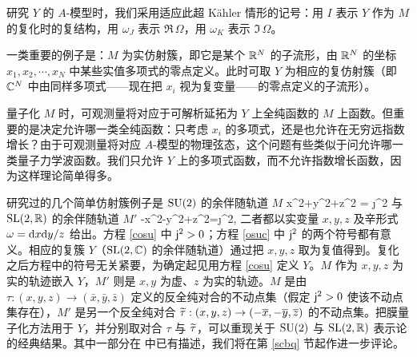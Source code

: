 研究 $Y$ 的 $A$-模型时，我们采用适应此超 Kähler 情形的记号：用 $I$ 表示 $Y$ 作为 $M$ 的复化时的复结构，用 $\omega_J$ 表示 $\Re\,\Omega$，用 $\omega_K$ 表示 $\Im\,\Omega$。

一类重要的例子是：$M$ 为实仿射簇，即它是某个 ${\mathbb R}^N$ 的子流形，由 ${\mathbb R}^N$ 的坐标 $x_1,x_2,\cdots, x_N$ 中某些实值多项式的零点定义。此时可取 $Y$ 为相应的复仿射簇（即 ${\mathbb C}^N$ 中由同样多项式——现在把 $x_i$ 视为复变量——的零点定义的子流形）。

量子化 $M$ 时，可观测量将对应于可解析延拓为 $Y$ 上全纯函数的 $M$ 上函数。但重要的是决定允许哪一类全纯函数：只考虑 $x_i$ 的多项式，还是也允许在无穷远指数增长？由于可观测量将对应 $A$-模型的物理弦态，这个问题有些类似于问允许哪一类量子力学波函数。我们只允许 $Y$ 上的多项式函数，而不允许指数增长函数，因为这样理论简单得多。

\cite{GW} 研究过的几个简单仿射簇例子是 ${\mathrm{SU}}(2)$ 的余伴随轨道 $M$
\be\label{cosu} x^2+y^2+z^2  = \j^2 \ee
与 ${\mathrm{SL}}(2,{\mathbb R})$ 的余伴随轨道 $M'$
\be\label{osuc}-x^2-y^2+z^2=\j^2, \ee
二者都以实变量 $x,y,z$ 及辛形式 $\omega= {\mathrm d} x{\mathrm d} y/z$ 给出。方程 \eqref{cosu} 中 ${\sf j}^2>0$；方程 \eqref{osuc} 中 ${\sf j}^2$ 的两个符号都有意义。相应的复簇 $Y$（${\mathrm{SL}}(2,{\mathbb C})$ 的余伴随轨道）通过把 $x,y,z$ 取为复值得到。复化之后方程中的符号无关紧要，为确定起见用方程 \eqref{cosu} 定义 $Y$。$M$ 作为 $x,y,z$ 为实的轨迹嵌入 $Y$，$M'$ 则是 $x,y$ 为虚、$z$ 为实的轨迹。$M$ 是由 $\tau:(x,y,z)\to (\bar x,\bar y,\bar z)$ 定义的反全纯对合的不动点集（假定 ${\sf j}^2>0$ 使该不动点集存在），$M'$ 是另一个反全纯对合 $\widetilde\tau:(x,y,z)\to (-\overline x, -\overline y, \overline z)$ 的不动点集。把膜量子化方法用于 $Y$，并分别取对合 $\tau$ 与 $\widetilde\tau$，可以重现关于 ${\mathrm{SU}}(2)$ 与 ${\mathrm{SL}}(2,{\mathbb R})$ 表示论的经典结果。其中一部分在 \cite{GW} 中已有描述，我们将在第 \ref{scbq} 节起作进一步评论。
